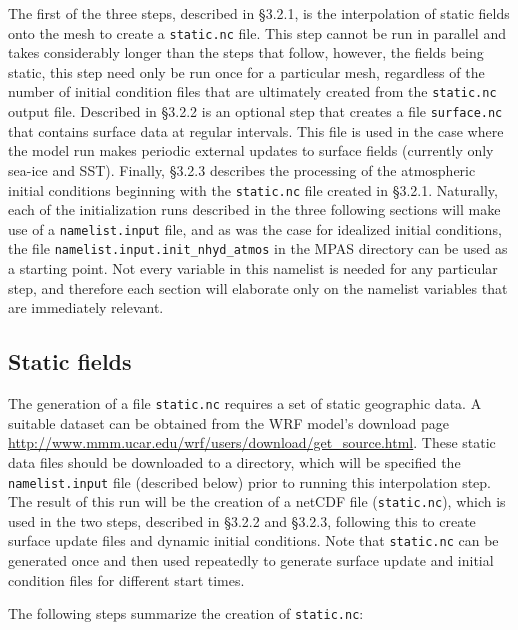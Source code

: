 The first of the three steps, described in \S 3.2.1, is the interpolation of static fields onto the mesh to create a {\tt static.nc} file.  This step cannot be run in parallel and takes considerably longer than the steps that follow, however, the fields being static, this step need only be run once for a particular mesh, regardless of the number of initial condition files that are ultimately created from the {\tt static.nc} output file.  Described in \S 3.2.2 is an optional step that creates a file {\tt surface.nc} that contains surface data at regular intervals. This file is used in the case where the model run makes periodic external updates to surface fields (currently only sea-ice and SST).  Finally, \S 3.2.3 describes the processing of the atmospheric initial conditions beginning with the {\tt static.nc} file created in \S 3.2.1.  Naturally, each of the initialization runs described in the three following sections will make use of a {\tt namelist.input} file, and as was the case for idealized initial conditions, the file {\tt namelist.input.init\_nhyd\_atmos} in the MPAS directory can be used as a starting point.  Not every variable in this namelist is needed for any particular step, and therefore each section will elaborate only on the namelist variables that are immediately relevant.

\subsection{Static fields}

The generation of a file {\tt static.nc} requires a set of static geographic data.  A suitable dataset can be obtained from the WRF model's download page \\
 \url{http://www.mmm.ucar.edu/wrf/users/download/get\_source.html}.  These static data files should be downloaded to a directory, which will be specified the {\tt namelist.input} file (described below) prior to running this interpolation step.  The result of this run will be the creation of a netCDF file ({\tt static.nc}), which is used in the two steps, described in \S 3.2.2 and \S 3.2.3, following this to create surface update files and dynamic initial conditions.  Note that {\tt static.nc} can be generated once and then used repeatedly to generate surface update and initial condition files for different start times.

The following steps summarize the creation of {\tt static.nc}:

